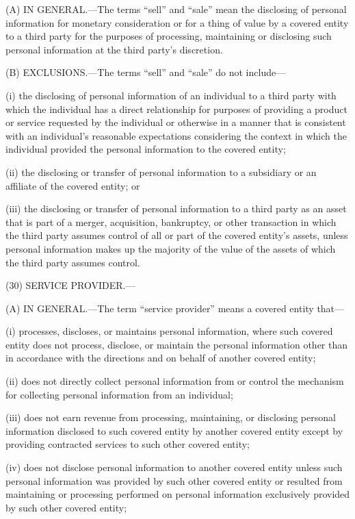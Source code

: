 (A) IN GENERAL.—The terms “sell” and “sale” mean the disclosing of personal information for monetary consideration or for a thing of value by a covered entity to a third party for the purposes of processing, maintaining or disclosing such personal information at the third party’s discretion.

(B) EXCLUSIONS.—The terms “sell” and “sale” do not include—

(i) the disclosing of personal information of an individual to a third party with which the individual has a direct relationship for purposes of providing a product or service requested by the individual or otherwise in a manner that is consistent with an individual’s reasonable expectations considering the context in which the individual provided the personal information to the covered entity;

(ii) the disclosing or transfer of personal information to a subsidiary or an affiliate of the covered entity; or

(iii) the disclosing or transfer of personal information to a third party as an asset that is part of a merger, acquisition, bankruptcy, or other transaction in which the third party assumes control of all or part of the covered entity’s assets, unless personal information makes up the majority of the value of the assets of which the third party assumes control.

(30) SERVICE PROVIDER.—

(A) IN GENERAL.—The term “service provider” means a covered entity that—

(i) processes, discloses, or maintains personal information, where such covered entity does not process, disclose, or maintain the personal information other than in accordance with the directions and on behalf of another covered entity;

(ii) does not directly collect personal information from or control the mechanism for collecting personal information from an individual;

(iii) does not earn revenue from processing, maintaining, or disclosing personal information disclosed to such covered entity by another covered entity except by providing contracted services to such other covered entity;

(iv) does not disclose personal information to another covered entity unless such personal information was provided by such other covered entity or resulted from maintaining or processing performed on personal information exclusively provided by such other covered entity;

